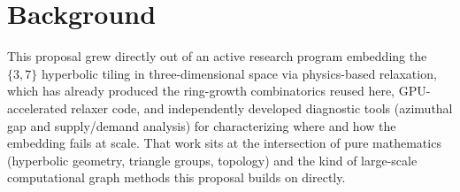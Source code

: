 \documentclass[11pt]{article}
\begin{document}
\section{Background}

This proposal grew directly out of an active research program embedding the $\{3,7\}$ hyperbolic tiling in three-dimensional space via physics-based relaxation, which has already produced the ring-growth combinatorics reused here, GPU-accelerated relaxer code, and independently developed diagnostic tools (azimuthal gap and supply/demand analysis) for characterizing where and how the embedding fails at scale. That work sits at the intersection of pure mathematics (hyperbolic geometry, triangle groups, topology) and the kind of large-scale computational graph methods this proposal builds on directly.

\nocite{brill2025progress,princint}


\end{document}
